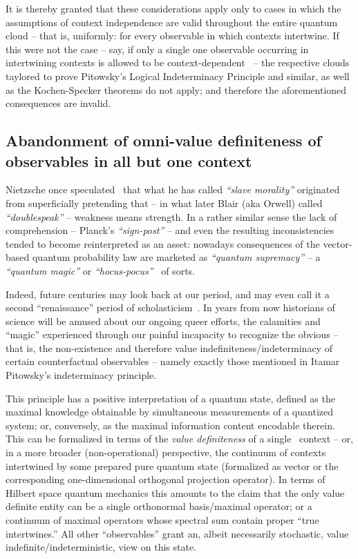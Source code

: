 \documentclass[%
  twocolumn,
 showpacs,
 showkeys,
 preprintnumbers,
 amsmath,amssymb,
 aps,
  pra,
  longbibliography,
 ]{revtex4-1}
\begin{document}
It is thereby granted that these considerations apply only to cases in which the assumptions of
context independence are valid throughout the entire quantum cloud -- that is, uniformly: for every observable
in which contexts intertwine.
If this were not the case -- say, if only a single one observable
occurring in intertwining contexts is allowed to be context-dependent~\citep{svozil-2011-enough,Simmons-2017} --
the respective
clouds taylored to prove
Pitowsky's Logical Indeterminacy Principle and similar, as well as the Kochen-Specker theorems do not apply;
and therefore the aforementioned consequences are invalid.

\subsection{Abandonment of omni-value definiteness of observables in all but one context}

Nietzsche once speculated~\citep{Nietzsche-GM,Nietzsche-GOMaEH} that what he has called {\em ``slave morality''}
originated from superficially pretending that
--
in what later Blair (aka Orwell) called~\citep{Orwell-1984} {\em ``doublespeak''}
--
weakness means strength.
In a rather similar sense the lack of comprehension
-- Planck's {\em ``sign-post''} --  and even the resulting inconsistencies
tended to become reinterpreted as an asset:  nowadays
consequences of the vector-based quantum probability law are marketed as {\em ``quantum supremacy''}
--
a {\em ``quantum magic''} or {\em ``hocus-pocus''}~\citep{svozil-2016-quantum-hokus-pokus} of sorts.

Indeed, future centuries may look back at our period, and may even call it a
second ``renaissance''  period of scholasticism~\citep{specker-60}.
In years from now historians of science will be amused
about our ongoing queer efforts, the calamities and ``magic'' experienced through our
painful incapacity to recognize the obvious
--
that is, the non-existence and therefore value indefiniteness/indeterminacy of certain counterfactual observables
--
namely exactly those mentioned in Itamar Pitowsky's indeterminacy principle.

This principle has a positive interpretation
of a quantum state, defined as the maximal knowledge obtainable by simultaneous measurements
of a quantized system; or,
conversely, as the maximal information content encodable therein.
This can be formalized in terms of the
{\em value definiteness} of a single~\citep{zeil-99,svozil-2002-statepart-prl,Grangier_2002,svozil-2003-garda,svozil-2018-whycontexts} context --
or, in a more broader (non-operational) perspective, the continuum of contexts intertwined by some prepared pure quantum state
(formalized as vector or the corresponding one-dimensional orthogonal projection operator).
In terms of Hilbert space quantum mechanics this amounts to the claim that the only
value definite entity can be a single orthonormal basis/maximal operator; or a continuum of
maximal operators whose spectral sum contain proper ``true intertwines.''
All other ``observables'' grant an, albeit necessarily stochastic, value
indefinite/indeterministic, view on this
state.
\end{document}
